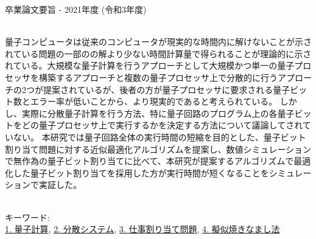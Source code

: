 卒業論文要旨 - 2021年度 (令和3年度)
\begin{center}
\begin{large}
\end{large}
\end{center}

~ \\

量子コンピュータは従来のコンピュータが現実的な時間内に解けないことが示されている問題の一部のの解より少ない時間計算量で得られることが理論的に示されている。大規模な量子計算を行うアプローチとして大規模かつ単一の量子プロセッサを構築するアプローチと複数の量子プロセッサ上で分散的に行うアプローチの2つが提案されているが、後者の方が量子プロセッサに要求される量子ビット数とエラー率が低いことから、より現実的であると考えられている。
しかし、実際に分散量子計算を行う方法、特に量子回路のプログラム上の各量子ビットをどの量子プロセッサ上で実行するかを決定する方法について議論してされていない。
本研究では量子回路全体の実行時間の短縮を目的とした、量子ビット割り当て問題に対する近似最適化アルゴリズムを提案し、数値シミュレーションで無作為の量子ビット割り当てに比べて、本研究が提案するアルゴリズムで最適化した量子ビット割り当てを採用した方が実行時間が短くなることをシミュレーションで実証した。

~ \\
キーワード:\\
\underline{1. 量子計算},
\underline{2. 分散システム},
\underline{3. 仕事割り当て問題},
\underline{4. 擬似焼きなまし法}
\begin{flushright}
\dept \\
\author
\end{flushright}
